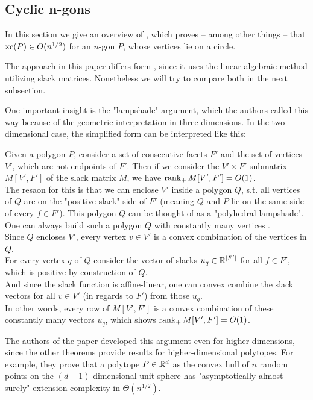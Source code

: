 \subsection{Cyclic n-gons}

In this section we give an overview of \cite{kwan2020extension}, which proves -- among other things -- that $\operatorname{xc}(P) \in O(n^{1/2})$ for an $n$-gon $P$, whose vertices lie on a circle.

The approach in this paper differs form \cite{shitov2020sublinear}, since it uses the linear-algebraic method utilizing slack matrices. Nonetheless we will try to compare both in the next subsection.

One important insight is the "lampshade" argument, which the authors called this way because of the geometric interpretation in three dimensions. In the two-dimensional case, the simplified form can be interpreted like this:

Given a polygon $P$, consider a set of consecutive facets $F'$ and the set of vertices $V'$, which are not endpoints of $F'$. Then if we consider the $V' \times F'$ submatrix $M[V',F']$ of the slack matrix $M$, we have $\operatorname{rank}_+ M[V',F'] = O(1)$.\\
The resaon for this is that we can enclose $V'$ inside a polygon $Q$, s.t. all vertices of $Q$ are on the "positive slack" side of $F'$ (meaning $Q$ and $P$ lie on the same side of every $f \in F'$). This polygon $Q$ can be thought of as a "polyhedral lampshade". One can always build such a polygon $Q$ with constantly many vertices .\\
Since $Q$ encloses $V'$, every vertex $v \in V'$ is a convex combination of the vertices in $Q$.\\
For every vertex $q$ of $Q$ consider the vector of slacks $u_q \in \mathbb{R}^{\lvert F'\rvert}$ for all $f \in F'$, which is positive by construction of $Q$.\\
And since the slack function is affine-linear, one can convex combine the slack vectors for all $v \in V'$ (in regards to $F'$) from those $u_q$.\\
In other words, every row of $M[V',F']$ is a convex combination of these constantly many vectors $u_q$, which shows $\operatorname{rank}_+ M[V',F'] = O(1)$.

The authors of the paper developed this argument even for higher dimensions, since the other theorems provide results for higher-dimensional polytopes. For example, they prove that a polytope $P \in \mathbb{R}^d$ as the convex hull of $n$ random points on the $(d-1)$-dimensional unit sphere has "asymptotically almost surely" extension complexity in $\Theta(n^{1/2})$.

